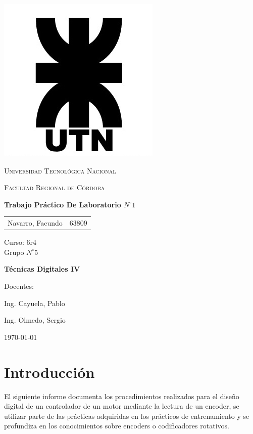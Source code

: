 \documentclass[11pt, a4paper]{article}
\begin{document}
\begin{titlepage}
 \centering
	\includegraphics[scale=0.80]{Imagenes/LOGO.jpg} \par
 	\vspace{1cm}
 	{\scshape\LARGE Universidad Tecnológica Nacional \par}
 	{\scshape\large Facultad Regional de Córdoba \par}
 	\vspace{1cm}
	{\bfseries \Large Trabajo Práctico De Laboratorio $N^{\circ} 1$\par}
 	\vspace{1.5cm}

	\begin{tabular}{ll}
		Navarro, Facundo		&	63809 	
	\end{tabular}
	
	\vspace{1cm}
	Curso: 6r4 \\
	Grupo $N^{\circ} 5$
 	\vfill
	{\bfseries \Large Técnicas Digitales IV\par}

	\vspace{1.5cm}
	Docentes: \par
	Ing. Cayuela, Pablo \par
	Ing. Olmedo, Sergio \par

 	\vfill
	{\large \today\par}
\end{titlepage}
	
	
\tableofcontents
\clearpage

\section{Introducción}
	El siguiente informe documenta los procedimientos realizados para el diseño digital de un controlador de un motor mediante la lectura de un encoder, se utilizar parte de las prácticas adquiridas en los prácticos de entrenamiento y se profundiza en los conocimientos sobre encoders o codificadores rotativos. 
\end{document}
